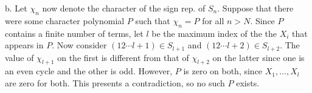 \documentclass{article}
\begin{document}
\noindent b. Let $\chi_n$ now denote the character of the sign rep. of $S_n$. Suppose that there were some character polynomial $P$ such that $\chi_n=P$ for all $n>N$. Since $P$ contains a finite number of terms, let $l$ be the maximum index of the the $X_i$ that appears in $P$. Now consider $(1 2 \cdots l+1)\in S_{l+1}$ and $(1 2 \cdots l+2)\in S_{l+2}$. The value of $\chi_{l+1}$ on the first is different from that of $\chi_{l+2}$ on the latter since one is an even cycle and the other is odd. However, $P$ is zero on both, since $X_1,\ldots,X_l$ are zero for both. This presents a contradiction, so no such $P$ exists.
\end{document}
